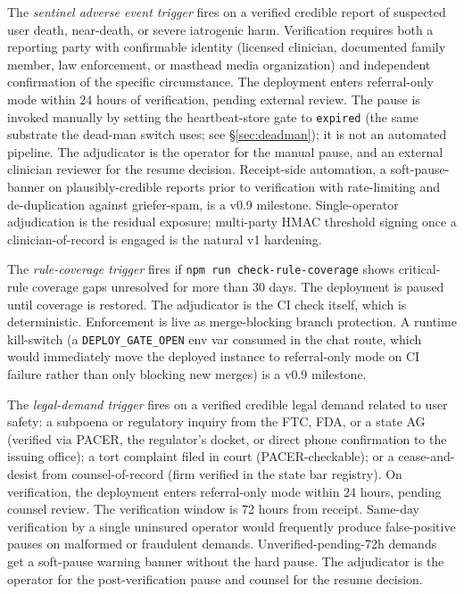 \documentclass[letterpaper]{article} %
\begin{document}
The \emph{sentinel adverse event trigger} fires on a verified credible report of suspected user death, near-death, or severe iatrogenic harm. Verification requires both a reporting party with confirmable identity (licensed clinician, documented family member, law enforcement, or masthead media organization) and independent confirmation of the specific circumstance. The deployment enters referral-only mode within 24 hours of verification, pending external review. The pause is invoked manually by setting the heartbeat-store gate to \texttt{expired} (the same substrate the dead-man switch uses; see \S\ref{sec:deadman}); it is not an automated pipeline. The adjudicator is the operator for the manual pause, and an external clinician reviewer for the resume decision. Receipt-side automation, a soft-pause-banner on plausibly-credible reports prior to verification with rate-limiting and de-duplication against griefer-spam, is a v0.9 milestone. Single-operator adjudication is the residual exposure; multi-party HMAC threshold signing once a clinician-of-record is engaged is the natural v1 hardening.

The \emph{rule-coverage trigger} fires if \texttt{npm run check-rule-coverage} shows critical-rule coverage gaps unresolved for more than 30 days. The deployment is paused until coverage is restored. The adjudicator is the CI check itself, which is deterministic. Enforcement is live as merge-blocking branch protection. A runtime kill-switch (a \texttt{DEPLOY\_GATE\_OPEN} env var consumed in the chat route, which would immediately move the deployed instance to referral-only mode on CI failure rather than only blocking new merges) is a v0.9 milestone.

The \emph{legal-demand trigger} fires on a verified credible legal demand related to user safety: a subpoena or regulatory inquiry from the FTC, FDA, or a state AG (verified via PACER, the regulator's docket, or direct phone confirmation to the issuing office); a tort complaint filed in court (PACER-checkable); or a cease-and-desist from counsel-of-record (firm verified in the state bar registry). On verification, the deployment enters referral-only mode within 24 hours, pending counsel review. The verification window is 72 hours from receipt. Same-day verification by a single uninsured operator would frequently produce false-positive pauses on malformed or fraudulent demands. Unverified-pending-72h demands get a soft-pause warning banner without the hard pause. The adjudicator is the operator for the post-verification pause and counsel for the resume decision.
\end{document}
